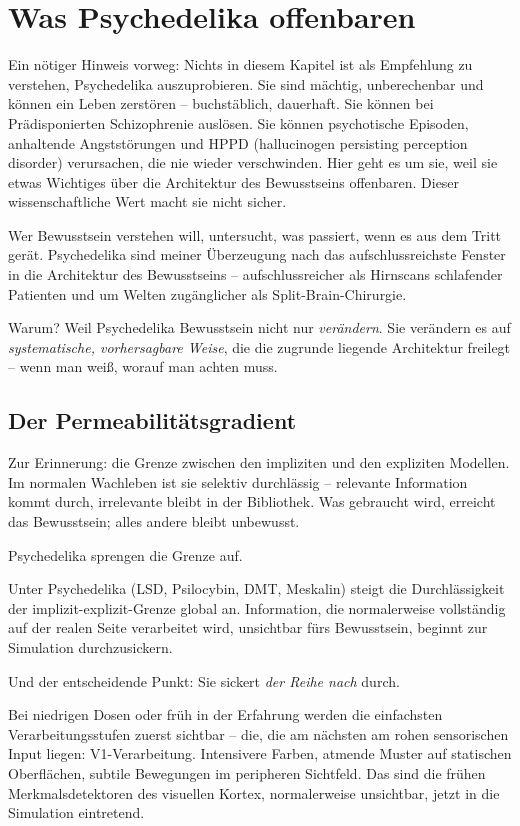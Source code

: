 \documentclass[11pt, twoside, openright]{book}
\begin{document}
\chapter{Was Psychedelika offenbaren}

Ein nötiger Hinweis vorweg: Nichts in diesem Kapitel ist als Empfehlung zu verstehen, Psychedelika auszuprobieren. Sie sind mächtig, unberechenbar und können ein Leben zerstören -- buchstäblich, dauerhaft. Sie können bei Prädisponierten Schizophrenie auslösen. Sie können psychotische Episoden, anhaltende Angststörungen und HPPD (hallucinogen persisting perception disorder) verursachen, die nie wieder verschwinden. Hier geht es um sie, weil sie etwas Wichtiges über die Architektur des Bewusstseins offenbaren. Dieser wissenschaftliche Wert macht sie nicht sicher.

Wer Bewusstsein verstehen will, untersucht, was passiert, wenn es aus dem Tritt gerät. Psychedelika sind meiner Überzeugung nach das aufschlussreichste Fenster in die Architektur des Bewusstseins -- aufschlussreicher als Hirnscans schlafender Patienten und um Welten zugänglicher als Split-Brain-Chirurgie.

Warum? Weil Psychedelika Bewusstsein nicht nur \textit{verändern}. Sie verändern es auf \textit{systematische, vorhersagbare Weise}, die die zugrunde liegende Architektur freilegt -- wenn man weiß, worauf man achten muss.

\section*{Der Permeabilitätsgradient}

Zur Erinnerung: die Grenze zwischen den impliziten und den expliziten Modellen. Im normalen Wachleben ist sie selektiv durchlässig -- relevante Information kommt durch, irrelevante bleibt in der Bibliothek. Was gebraucht wird, erreicht das Bewusstsein; alles andere bleibt unbewusst.

Psychedelika sprengen die Grenze auf.

Unter Psychedelika (LSD, Psilocybin, DMT, Meskalin) steigt die Durchlässigkeit der implizit-explizit-Grenze global an. Information, die normalerweise vollständig auf der realen Seite verarbeitet wird, unsichtbar fürs Bewusstsein, beginnt zur Simulation durchzusickern.

Und der entscheidende Punkt: Sie sickert \textit{der Reihe nach} durch.

Bei niedrigen Dosen oder früh in der Erfahrung werden die einfachsten Verarbeitungsstufen zuerst sichtbar -- die, die am nächsten am rohen sensorischen Input liegen: V1-Verarbeitung. Intensivere Farben, atmende Muster auf statischen Oberflächen, subtile Bewegungen im peripheren Sichtfeld. Das sind die frühen Merkmalsdetektoren des visuellen Kortex, normalerweise unsichtbar, jetzt in die Simulation eintretend.
\end{document}

